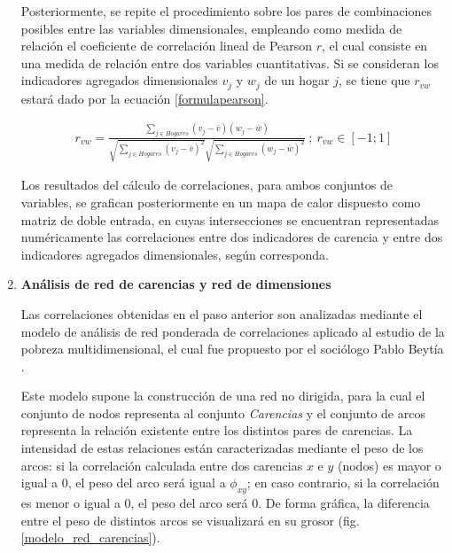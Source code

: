 \documentclass[12pt,letterpaper,spanish]{article}
\begin{document}
\begin{enumerate}
Posteriormente, se repite el procedimiento sobre los pares de combinaciones posibles entre las variables dimensionales, empleando como medida de relación el coeficiente de correlación lineal de Pearson $r$, el cual consiste en una medida de relación entre dos variables cuantitativas. Si se consideran los indicadores agregados dimensionales $v_j$ y $w_j$ de un hogar $j$, se tiene que $r_{vw}$ estará dado por la ecuación \ref{formulapearson}.


\begin{equation} \label{formulapearson}
\begin{split}
r_{vw}=\frac{ \sum_{j\in Hogares}^{}(v_j-\bar{v})(w_j-\bar{w}) }{
        \sqrt{\sum_{j \in Hogares}^{}(v_j-\bar{v})^2}\sqrt{\sum_{j\in Hogares}^{}(w_j-\bar{w})^2}}\: ;\: r_{vw} \in [-1;1]
\end{split}
\end{equation}

\vspace{2em}




Los resultados del cálculo de correlaciones, para ambos conjuntos de variables, se grafican posteriormente en un mapa de calor dispuesto como matriz de doble entrada, en cuyas intersecciones se encuentran representadas numéricamente las correlaciones entre dos indicadores de carencia y entre dos indicadores agregados dimensionales, según corresponda.

\vspace{2em}

\item \textbf{Análisis de red de carencias y red de dimensiones}

Las correlaciones obtenidas en el paso anterior son analizadas mediante el modelo de análisis de red ponderada de correlaciones aplicado al estudio de la pobreza multidimensional, el cual fue propuesto por el sociólogo Pablo Beytía \cite{Beytia2016PobrezaChile}. 

Este modelo supone la construcción de una red no dirigida, para la cual el conjunto de nodos representa al conjunto \textit{Carencias} y el conjunto de arcos representa la relación existente entre los distintos pares de carencias. La intensidad de estas relaciones están caracterizadas mediante el peso de los arcos: si la correlación calculada entre dos carencias $x$ e $y$ (nodos) es mayor o igual a $0$, el peso del arco será igual a $\phi_{xy}$; en caso contrario, si la correlación es menor o igual a $0$, el peso del arco será $0$. De forma gráfica, la diferencia entre el peso de distintos arcos se visualizará en su grosor (fig. \ref{modelo_red_carencias}).



\end{enumerate}
\end{document}
